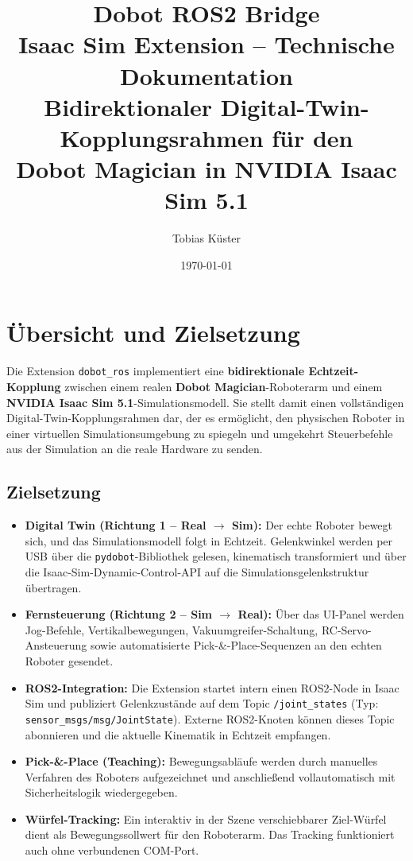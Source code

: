 \documentclass[11pt,a4paper]{article}
\title{
  \textbf{Dobot ROS2 Bridge}\\[6pt]
  \large Isaac Sim Extension -- Technische Dokumentation\\[4pt]
  \normalsize Bidirektionaler Digital-Twin-Kopplungsrahmen für den\\
  Dobot Magician in NVIDIA Isaac Sim 5.1
}
\author{Tobias Küster}
\date{\today}
\begin{document}
\maketitle
\tableofcontents
\newpage

\section{Übersicht und Zielsetzung}

Die Extension \texttt{dobot\_ros} implementiert eine \textbf{bidirektionale
Echtzeit-Kopplung} zwischen einem realen \textbf{Dobot Magician}-Roboterarm
und einem \textbf{NVIDIA Isaac Sim 5.1}-Simulationsmodell. Sie stellt damit
einen vollständigen Digital-Twin-Kopplungsrahmen dar, der es ermöglicht,
den physischen Roboter in einer virtuellen Simulationsumgebung zu spiegeln
und umgekehrt Steuerbefehle aus der Simulation an die reale Hardware zu
senden.

\subsection{Zielsetzung}
\begin{itemize}
  \item \textbf{Digital Twin (Richtung 1 -- Real $\to$ Sim):}
        Der echte Roboter bewegt sich, und das Simulationsmodell folgt
        in Echtzeit. Gelenkwinkel werden per USB über die
        \texttt{pydobot}-Bibliothek gelesen, kinematisch transformiert
        und über die Isaac-Sim-Dynamic-Control-API auf die
        Simulationsgelenkstruktur übertragen.
  \item \textbf{Fernsteuerung (Richtung 2 -- Sim $\to$ Real):}
        Über das UI-Panel werden Jog-Befehle, Vertikalbewegungen,
        Vakuumgreifer-Schaltung, RC-Servo-Ansteuerung sowie
        automatisierte Pick-\&-Place-Sequenzen an den echten
        Roboter gesendet.
  \item \textbf{ROS2-Integration:}
        Die Extension startet intern einen ROS2-Node in Isaac Sim und
        publiziert Gelenkzustände auf dem Topic \texttt{/joint\_states}
        (Typ: \texttt{sensor\_msgs/msg/JointState}). Externe ROS2-Knoten
        können dieses Topic abonnieren und die aktuelle
        Kinematik in Echtzeit empfangen.
  \item \textbf{Pick-\&-Place (Teaching):}
        Bewegungsabläufe werden durch manuelles Verfahren des
        Roboters aufgezeichnet und anschließend vollautomatisch mit
        Sicherheitslogik wiedergegeben.
  \item \textbf{Würfel-Tracking:}
        Ein interaktiv in der Szene verschiebbarer Ziel-Würfel
        dient als Bewegungssollwert für den Roboterarm.
        Das Tracking funktioniert auch ohne verbundenen COM-Port.
\end{itemize}
\end{document}
